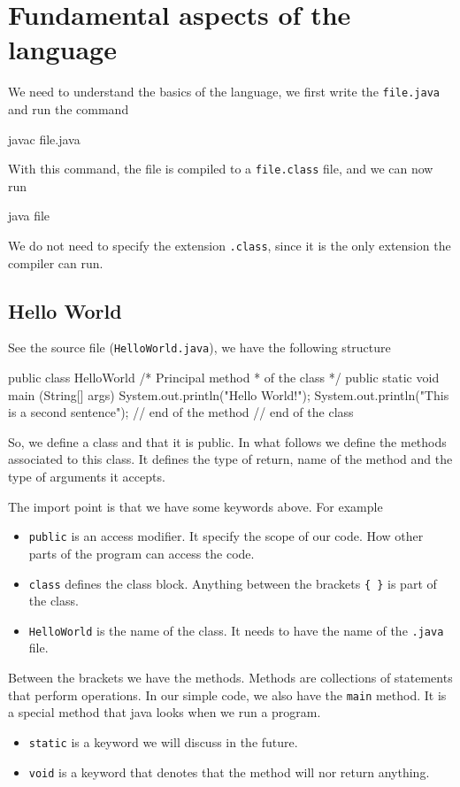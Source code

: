 \section{Fundamental aspects of the language}

We need to understand the basics of the language, we first write the \verb|file.java|
and run the command 
\begin{listing}{1}
javac file.java
\end{listing}
With this command, the file is compiled to a \verb|file.class| file, and we can now run
\begin{listing}{1}
java file     
\end{listing}    
We do not need to specify the extension \verb|.class|, since it is the only extension the compiler 
can run.

\subsection{Hello World}

See the source file (\verb|HelloWorld.java|), we have the following structure
\begin{listing}{1}
public class HelloWorld {
    /* Principal method 
     * of the class */
    public static void main (String[] args){
        System.out.println("Hello World!");
        System.out.println("This is a second sentence");
    }// end of the method
}// end of the class
\end{listing}
So, we define a class and that it is public. In what follows we define the methods associated to 
this class. It defines the type of return, name of the method and the type of arguments it accepts. 

The import point is that we have some keywords above. For example
\begin{itemize}
    \item \verb|public| is an access modifier. It specify the scope of our code. How other parts 
of the program can access the code.
    \item \verb|class| defines the class block. Anything between the brackets \verb|{ }| is part 
of the class.
    \item \verb|HelloWorld| is the name of the class. It needs to have the name of the \verb|.java|
file. 
\end{itemize}
Between the brackets we have the methods. Methods are collections of statements that perform 
operations. In our simple code, we also have the \verb|main| method. It is a special method that 
java looks 
when we run a program. 
\begin{itemize}
    \item \verb|static| is a keyword we will discuss in the future. 
    \item \verb|void| is a keyword that denotes that the method will nor return anything.    
\end{itemize}

